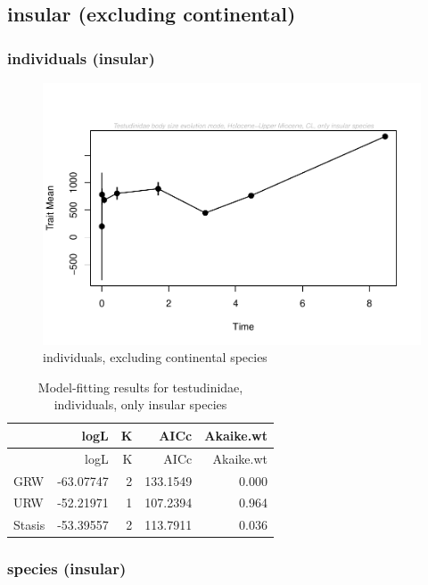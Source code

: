 \documentclass[]{article}
\begin{document}
\newpage

\subsection{insular (excluding
continental)}\label{insular-excluding-continental}

\subsubsection{individuals (insular)}\label{individuals-insular}

\begin{figure}[htbp]
\centering
\includegraphics{MA_JJ_files/figure-latex/paleoTS, individuals, exluding continental species-1.pdf}
\caption{individuals, excluding continental species}
\end{figure}

\begin{longtable}[]{@{}lrrrr@{}}
\caption{Model-fitting results for testudinidae, individuals, only
insular species}\tabularnewline
\toprule
& logL & K & AICc & Akaike.wt\tabularnewline
\midrule
\endfirsthead
\toprule
& logL & K & AICc & Akaike.wt\tabularnewline
\midrule
\endhead
GRW & -63.07747 & 2 & 133.1549 & 0.000\tabularnewline
URW & -52.21971 & 1 & 107.2394 & 0.964\tabularnewline
Stasis & -53.39557 & 2 & 113.7911 & 0.036\tabularnewline
\bottomrule
\end{longtable}

\newpage

\subsubsection{species (insular)}\label{species-insular}
\end{document}
